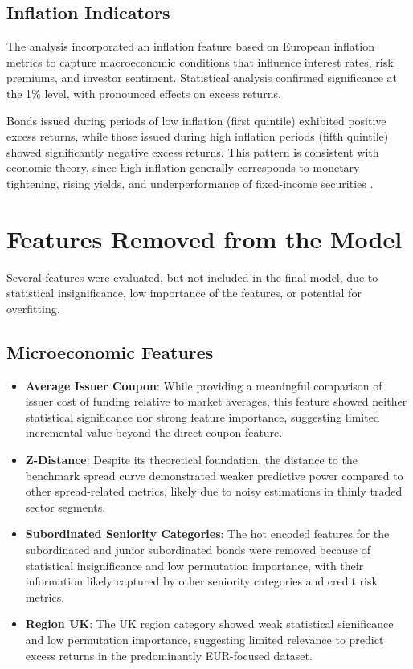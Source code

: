 \subsection{Inflation Indicators}
The analysis incorporated an inflation feature based on European inflation metrics to capture macroeconomic conditions that influence interest rates, risk premiums, and investor sentiment. Statistical analysis confirmed significance at the 1\% level, with pronounced effects on excess returns.

Bonds issued during periods of low inflation (first quintile) exhibited positive excess returns, while those issued during high inflation periods (fifth quintile) showed significantly negative excess returns. This pattern is consistent with economic theory, since high inflation generally corresponds to monetary tightening, rising yields, and underperformance of fixed-income securities \parencite{Ngaruiya2016InfluenceSecurities}.

\section{Features Removed from the Model}

Several features were evaluated, but not included in the final model, due to statistical insignificance, low importance of the features, or potential for overfitting.

\subsection{Microeconomic Features}

\begin{itemize}
    \item \textbf{Average Issuer Coupon}: While providing a meaningful comparison of issuer cost of funding relative to market averages, this feature showed neither statistical significance nor strong feature importance, suggesting limited incremental value beyond the direct coupon feature.
    \item \textbf{Z-Distance}: Despite its theoretical foundation, the distance to the benchmark spread curve demonstrated weaker predictive power compared to other spread-related metrics, likely due to noisy estimations in thinly traded sector segments.
    \item \textbf{Subordinated Seniority Categories}: The hot encoded features for the subordinated and junior subordinated bonds were removed because of statistical insignificance and low permutation importance, with their information likely captured by other seniority categories and credit risk metrics.
    \item \textbf{Region UK}: The UK region category showed weak statistical significance and low permutation importance, suggesting limited relevance to predict excess returns in the predominantly EUR-focused dataset.
\end{itemize}

